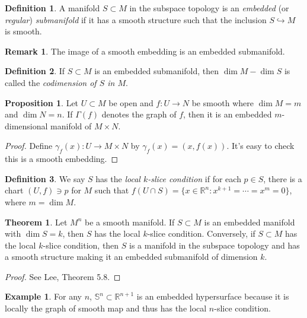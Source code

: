 \documentclass[10pt,letterpaper,cm]{nupset}
\theoremstyle{definition}
\newtheorem*{definition}{Definition}
\newtheorem{exmp}{Example}
\newtheorem{remark}{Remark}
\newtheorem{theorem}{Theorem}
\newtheorem{prop}{Proposition}
\newcommand{\R}{\mathbb R}
\renewcommand{\S}{\mathbb S}
\newcommand{\1}{\mathbf{1}}
\newcommand{\0}{\vec 0}
\begin{document}
\begin{definition}
A manifold $ S\subset M$ in the subspace topology is an \textit{embedded} (or \textit{regular}) \textit{submanifold} if it has a smooth structure such that the inclusion $S \hookrightarrow M$ is smooth.
\end{definition}

\begin{remark}
The image of a smooth embedding is an embedded submanifold.
\end{remark}

\begin{definition}
If $S \subset M$ is an embedded submanifold, then $\dim M - \dim S$ is called the \textit{codimension of $S$ in $M$}.
\end{definition}

\begin{prop}
Let $U \subset M$ be open and $f: U \to N$ be smooth where $\dim M = m$ and $\dim N = n$. If $\Gamma(f)$ denotes the graph of $f$, then it is an embedded $m$-dimensional manifold of $M \times N$.
\end{prop}
\begin{proof}
Define $\gamma_f(x) : U \to M \times N$ by $\gamma_f(x) = (x, f(x))$. It's easy to check this is a smooth embedding.
\end{proof}

\begin{definition}
We say $S$ has the \textit{local $k$-slice condition} if for each $p\in S$, there is a chart $(U, f)\ni p$ for $M$ such that $f(U \cap S) = \{x\in \R^n : x^{k+1} = \cdots = x^m = 0\}$, where $m = \dim M$.
\end{definition}

\begin{theorem}
Let $M^n$ be a smooth manifold. If $S\subset M$ is an embedded manifold with $\dim S = k$, then $S$ has the local $k$-slice condition. Conversely, if $S\subset M$ has the local $k$-slice condition, then $S$ is a manifold in the subspace topology and has a smooth structure making it an embedded submanifold of dimension $k$.
\end{theorem}
\begin{proof}
See Lee, Theorem 5.8.
\end{proof}

\begin{exmp}
For any $n$, $\S^n \subset \R^{n+1}$ is an embedded hypersurface because it is locally the graph of smooth map and thus has the local $n$-slice condition.
\end{exmp}
\end{document}
